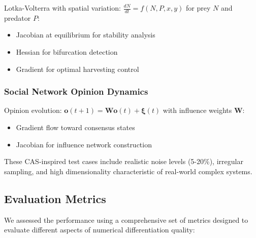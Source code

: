 \documentclass[10pt,journal,compsoc]{IEEEtran}
\begin{document}
Lotka-Volterra with spatial variation: $\frac{dN}{dt} = f(N, P, x, y)$ for prey $N$ and predator $P$:
\begin{itemize}
    \item Jacobian at equilibrium for stability analysis
    \item Hessian for bifurcation detection
    \item Gradient for optimal harvesting control
\end{itemize}

\subsubsection{Social Network Opinion Dynamics}

Opinion evolution: $\mathbf{o}(t+1) = \mathbf{W}\mathbf{o}(t) + \boldsymbol{\xi}(t)$ with influence weights $\mathbf{W}$:
\begin{itemize}
    \item Gradient flow toward consensus states
    \item Jacobian for influence network construction
\end{itemize}

These CAS-inspired test cases include realistic noise levels (5-20\%), irregular sampling, and high dimensionality characteristic of real-world complex systems.

\subsection{Evaluation Metrics}

We assessed the performance using a comprehensive set of metrics designed to evaluate different aspects of numerical differentiation quality:
\end{document}
